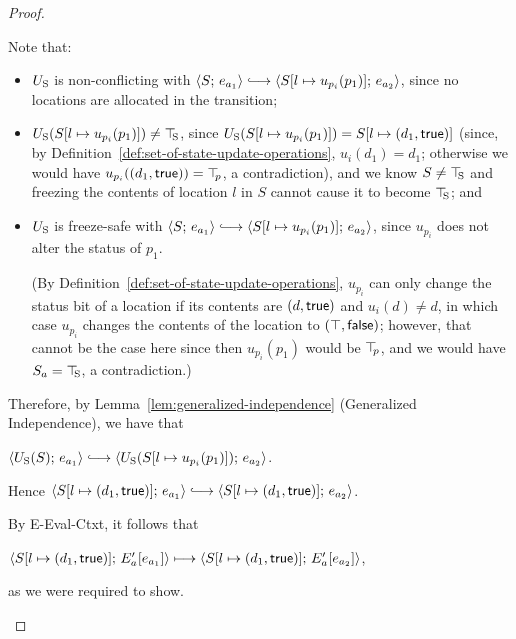 \begin{proof}
\begin{enumerate}
\begin{enumerate}
\begin{itemize}
\begin{itemize}
          Note that:
          \begin{itemize}
          \item $U_{\mathrm{S}}$ is non-conflicting with $\config{S}{e_{a_1}}
            \parstepsto
            \config{\extSRaw{S}{l}{u_{p_i}(p_1)}}{e_{a_2}}$, since no
            locations are allocated in the transition;
          \item $U_{\mathrm{S}}(S[l \mapsto u_{p_i}(p_1)]) \neq \top\hspace{-0.85mm}_{\mathrm{S}}$,
            since $U_{\mathrm{S}}(S[l \mapsto u_{p_i}(p_1)]) =
            S[l \mapsto (d_1, \textsf{true})]$ (since, by
            Definition~\ref{def:set-of-state-update-operations},
            $u_i(d_1) = d_1$; otherwise we would have
            $u_{p_i}((d_1, \textsf{true})) = \top\hspace{-0.85mm}_{p}$, a
            contradiction), and we know $S \neq \top\hspace{-0.85mm}_{\mathrm{S}}$ and
            freezing the contents of location $l$ in $S$ cannot
            cause it to become $\top\hspace{-0.85mm}_{\mathrm{S}}$; and
          \item $U_{\mathrm{S}}$ is freeze-safe with $\config{S}{e_{a_1}}
            \parstepsto
            \config{\extSRaw{S}{l}{u_{p_i}(p_1)}}{e_{a_2}}$, since
            $u_{p_i}$ does not alter the status of $p_1$.

            (By Definition~\ref{def:set-of-state-update-operations},
            $u_{p_i}$ can only change the status bit of a location if
            its contents are $(d, \textsf{true})$ and $u_i(d) \neq
            d$, in which case $u_{p_i}$ changes the contents of the
            location to $(\top, \textsf{false})$; however, that
            cannot be the case here since then $u_{p_i}(p_1)$ would be
            $\top\hspace{-0.85mm}_{p}$, and we would have $S_a = \top\hspace{-0.85mm}_{\mathrm{S}}$, a
            contradiction.)
          \end{itemize}
          Therefore, by Lemma~\ref{lem:generalized-independence}
          (Generalized Independence), we have that

          $\config{\Ustore(S)}{e_{a_1}} \parstepsto
          \config{\Ustore(\extSRaw{S}{l}{u_{p_i}(p_1)})}{e_{a_2}}$.

          Hence $\config{\extS{S}{l}{d_1}{\frozentrue}}{e_{a_1}}
          \parstepsto
          \config{\extS{S}{l}{d_1}{\frozentrue}}{e_{a_2}}$.

          By {\sc E-Eval-Ctxt}, it follows that

          $\langle S[l \mapsto (d_1, \textsf{true})];\, E'_a\hspace{-0.5mm}\left[e_{a_1}\right] \rangle
          \longmapsto
          \langle S[l \mapsto (d_1, \textsf{true})];\, E'_a\hspace{-0.5mm}\left[e_{a_2}\right] \rangle$,

          as we were required to show.
        \end{itemize}


\end{itemize}
\end{enumerate}
\end{enumerate}
\end{proof}
